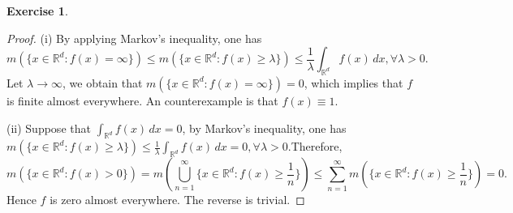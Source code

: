 \documentclass[a4paper]{article}
\newtheorem{ex}{Exercise}[subsection]
\begin{document}
\begin{ex}\end{ex}
\begin{proof}
(i) By applying Markov's inequality, one has $$
m(\{x \in \mathbb{R}^d : f(x) = \infty\}) \leq m(\{x \in \mathbb{R}^d : f(x) \geq \lambda\}) \leq \frac{1}{\lambda}
\int_{\mathbb{R}^d} f(x)\,dx, \forall \lambda > 0.
$$Let $\lambda \to \infty$, we obtain that $m(\{x \in \mathbb{R}^d : f(x) = \infty\}) = 0$, which implies that
$f$ is finite almost everywhere. An counterexample is that $f(x) \equiv 1$.

(ii) Suppose that $\int_{\mathbb{R}^d} f(x)\,dx = 0$, by Markov's inequality, one has $
m(\{x \in \mathbb{R}^d : f(x) \geq \lambda\}) \leq \frac{1}{\lambda}\int_{\mathbb{R}^d} f(x)\,dx = 0, \forall \lambda > 0.
$Therefore, $$
m(\{x \in \mathbb{R}^d : f(x) > 0\}) = m(\bigcup_{n = 1}^\infty \{x \in \mathbb{R}^d : f(x) \geq \frac{1}{n}\}) \leq 
\sum_{n = 1}^\infty m(\{x \in \mathbb{R}^d : f(x) \geq \frac{1}{n}\}) = 0.
$$Hence $f$ is zero almost everywhere. The reverse is trivial.
\end{proof}
\end{document}
